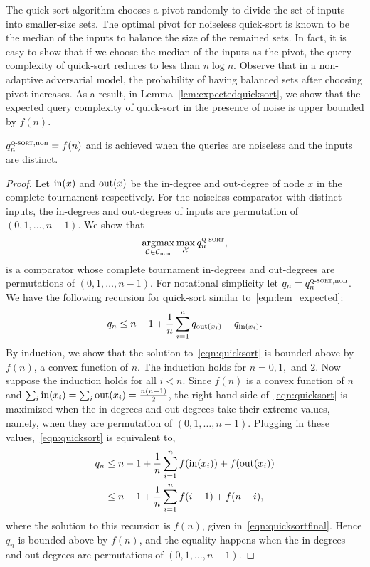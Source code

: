 \documentclass[twoside,11pt]{article}
\newcommand{\cC}{\mathcal{C}}
\newcommand{\cX}{\mathcal{X}}
\newcommand{\argmax}{\operatornamewithlimits{argmax}}
\newcommand{\algorithms}[1]{\textsc{#1}}
\newcommand{\algquicksort}{\algorithms{q-sort}}
\newcommand{\din}{\textnormal{in}}
\newcommand{\dout}{\textnormal{out}}
\newcommand{\nonadaptivecomp}{\cC_{\textnormal{non}}}
\newcommand{\nonadaptive}{\textnormal{non}}
\begin{document}
The quick-sort algorithm chooses a pivot randomly to divide the set of
inputs into smaller-size sets. The optimal pivot for noiseless
quick-sort is known to be the median of the inputs to balance the size
of the remained sets. In fact, it is easy to show that if we choose
the median of the inputs as the pivot, the query complexity of quick-sort
reduces to less than $n\log n$. Observe
that in a non-adaptive adversarial model, the probability of having
balanced sets after choosing pivot increases. As a result, in
Lemma~\ref{lem:expectedquicksort}, we show that the expected query complexity of quick-sort in the
presence of noise is upper bounded by $f(n)$.
\begin{lemma}
\label{lem:expectedquicksort}
 $q_n^{\algquicksort,\nonadaptive}=f(n)$ and is achieved when
the queries are noiseless and the inputs are distinct.
\end{lemma}
\begin{proof}
 Let $\din(x)$ and $\dout(x)$ be the in-degree and out-degree of node
 $x$ in the complete tournament respectively. For the noiseless
 comparator with distinct inputs, the in-degrees and out-degrees of
 inputs are permutation of $(0,1,\ldots,n-1)$. We show that
 \[
   \argmax_{\cC\in\nonadaptivecomp}\max_{\cX} q_n^{\algquicksort},
 \]
 is a comparator whose complete tournament in-degrees and
 out-degrees are permutations of $(0,1,\ldots,n-1)$. For notational simplicity
 let $q_n=q_n^{\algquicksort,\nonadaptive}$. We have the
 following recursion for quick-sort similar
 to~\eqref{eqn:lem_expected}:
 \begin{align}
 \label{eqn:quicksort}
 q_n\le n-1+\frac{1}{n}\sum_{i=1}^n q_{\dout(x_i)}+q_{\din(x_i)}.
\end{align}
By induction, we show that the solution to~\eqref{eqn:quicksort} is
bounded above by $f(n)$, a convex function of $n$. The induction holds
for $n=0,1,$ and $2$. Now suppose the induction holds for all
$i<n$. Since $f(n)$ is a convex function of $n$ and $\sum_i
\din(x_i)=\sum_i \dout(x_i)=\frac{n(n-1)}{2}$, the right hand side
of~\eqref{eqn:quicksort} is maximized when the in-degrees and
out-degrees take their extreme values, namely, when they are permutation
of $(0,1,\ldots,n-1)$. Plugging in these values,~\eqref{eqn:quicksort}
is equivalent to,
\begin{align*}
 q_n&\le n-1+\frac{1}{n}\sum_{i=1}^n f(\din(x_i))+f(\dout(x_i))\\
    &\le n-1+\frac{1}{n}\sum_{i=1}^n f(i-1)+f(n-i),
\end{align*}
where the solution to this recursion is $f(n)$, given
in~\eqref{eqn:quicksortfinal}.  Hence $q_n$ is bounded above by $f(n)$,
and the equality happens when the in-degrees and out-degrees are
permutations of $(0,1,\ldots,n-1)$.
\end{proof}
\end{document}

